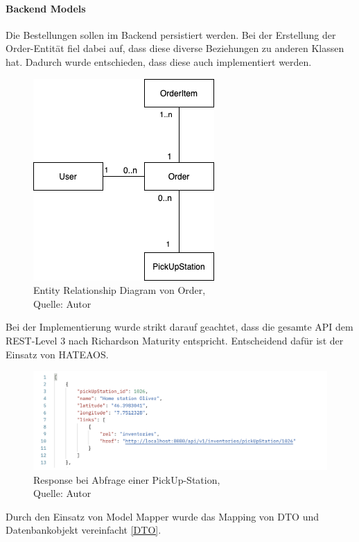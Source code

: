 \paragraph{Backend Models}
Die Bestellungen sollen im Backend persistiert werden. Bei der Erstellung der Order-Entität fiel dabei auf, dass diese diverse Beziehungen zu anderen Klassen hat. Dadurch wurde entschieden, dass diese auch implementiert werden. 
 \begin{figure}[H]
	\centering
	\includegraphics[scale=0.5]{images/erdOrder.PNG}
	\caption[Entity Relationship Diagram von Order]{Entity Relationship Diagram von Order,\\ Quelle: Autor}
	\label{img: erdOrder}
\end{figure} 
Bei der Implementierung wurde strikt darauf geachtet, dass die gesamte API dem REST-Level 3 nach  Richardson Maturity entspricht. Entscheidend dafür ist der Einsatz von \ac{HATEAOS}. 
 \begin{figure}[H]
	\centering
	\includegraphics[scale=0.5]{images/pickUpJSON.PNG}
	\caption[Response bei Abfrage einer PickUp-Station]{Response bei Abfrage einer PickUp-Station,\\ Quelle: Autor}
	\label{img: responseRequest}
\end{figure} 

Durch den Einsatz von Model Mapper wurde das Mapping von DTO und Datenbankobjekt vereinfacht \ref{DTO}. 



